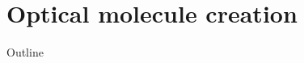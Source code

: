 \documentclass{beamer}
\begin{document}
\section{Optical molecule creation}
\begin{frame}{Outline}
  \tableofcontents[currentsection]
\end{frame}

\end{document}
